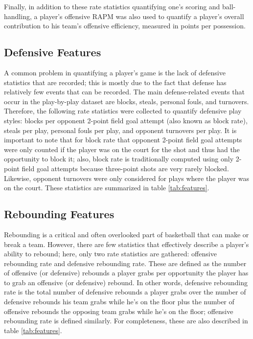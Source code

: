 Finally, in addition to these rate statistics quantifying one's scoring and
ball-handling, a player's offensive RAPM was also used to quantify a player's
overall contribution to his team's offensive efficiency, measured in points per
possession.

\subsection{Defensive Features}

A common problem in quantifying a player's game is the lack of defensive statistics
that are recorded; this is mostly due to the fact that defense has relatively few
events that can be recorded. The main defense-related events that occur in the
play-by-play dataset are blocks, steals, personal fouls, and turnovers. Therefore,
the following rate statistics were collected to quantify defensive play styles:
blocks per opponent 2-point field goal attempt (also known as block rate), steals
per play, personal fouls per play, and opponent turnovers per play. It is important
to note that for block rate that opponent 2-point field goal attempts were only
counted if the player was on the court for the shot and thus had the opportunity to
block it; also, block rate is traditionally computed using only 2-point field goal
attempts because three-point shots are very rarely blocked. Likewise, opponent
turnovers were only considered for plays where the player was on the court. These
statistics are summarized in table \ref{tab:features}.

\subsection{Rebounding Features}

Rebounding is a critical and often overlooked part of basketball that can make or
break a team. However, there are few statistics that effectively describe a player's
ability to rebound; here, only two rate statistics are gathered: offensive
rebounding rate and defensive rebounding rate. These are defined as the number of
offensive (or defensive) rebounds a player grabs per opportunity the player has to
grab an offensive (or defensive) rebound. In other words, defensive rebounding rate
is the total number of defensive rebounds a player grabs over the number of
defensive rebounds his team grabs while he's on the floor plus the number of
offensive rebounds the opposing team grabs while he's on the floor; offensive
rebounding rate is defined similarly. For completeness, these are also described in
table \ref{tab:features}.

